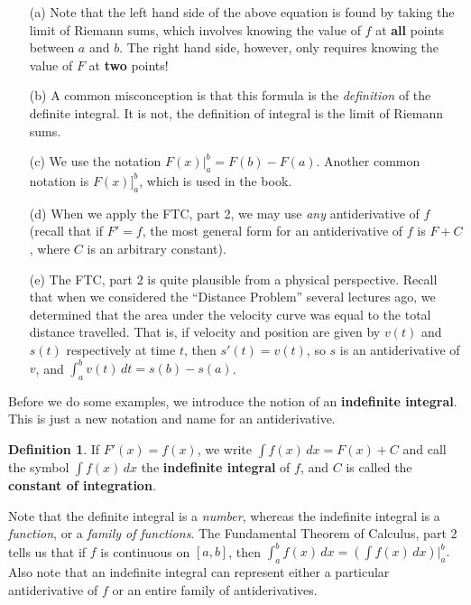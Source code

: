 \documentclass[t]{beamer}
\theoremstyle{plain}
\theoremstyle{definition}
\newtheorem{dfn}{Definition}
\newcounter{heading}
\newcommand{\newhead}[1]{\medskip\stepcounter{heading}\noindent\textbf{\hspace{0.2cm}{#1}.}}
\begin{document}
\begin{frame}
\uncover<+->{\newhead{Remarks on Part 2}}
\begin{enumerate}[<+->]
\item[(a)] Note that the left hand side of the above equation is found by taking the limit of Riemann sums, which involves knowing the value of $f$ at \textbf{all} points between $a$ and $b$.  The right hand side, however, only requires knowing the value of $F$ at \textbf{two} points!

\item[(b)] A common misconception is that this formula is the \emph{definition} of the definite integral.  It is not, the definition of integral is the limit of Riemann sums.  

\item[(c)] We use the notation $F(x)\big|_{a}^{b} = F(b) - F(a)$.  Another common notation is $F(x)\big]_{a}^{b}$, which is used in the book.
\item[(d)] When we apply the FTC, part 2, we may use \emph{any} antiderivative of $f$ (recall that if $F' = f$, the most general form for an antiderivative of $f$ is $F + C$, where $C$ is an arbitrary constant).
\end{enumerate}
\end{frame}

\begin{frame}
\uncover<+->{\newhead{Remarks on Part 2}}
\begin{enumerate}[<+->]
\item[(e)] The FTC, part 2 is quite plausible from a physical perspective.  Recall that when we considered the ``Distance Problem'' several lectures ago, we determined that the area under the velocity curve was equal to the total distance travelled.  That is, if velocity and position are given by $v(t)$ and $s(t)$ respectively at time $t$, then $s'(t) = v(t)$, so $s$ is an antiderivative of $v$, and $\int_{a}^{b}v(t)\, dt = s(b) - s(a)$.
\end{enumerate}
\end{frame}

\begin{frame}
\noindent Before we do some examples, we introduce the notion of an \textbf{indefinite integral}.  This is just a new notation and name for an antiderivative.\pause

\begin{dfn} If $F'(x) = f(x)$, we write $\int f(x)\, dx = F(x)+C$ and call the symbol $\int f(x)\, dx$ the \textbf{indefinite integral} of $f$, and $C$ is called the \textbf{constant of integration}.\end{dfn}\pause


\medskip
\noindent Note that the definite integral is a \emph{number}, whereas the indefinite integral is a \emph{function}, or a \emph{family of functions}.  The Fundamental Theorem of Calculus, part 2 tells us that if $f$ is continuous on $[a,b]$, then $\int_{a}^{b}f(x)\, dx = (\int f(x)\,dx) \big|_{a}^{b}.$  Also note that an indefinite integral can represent either a particular antiderivative of $f$ or an entire family of antiderivatives.
\end{frame}
\end{document}
